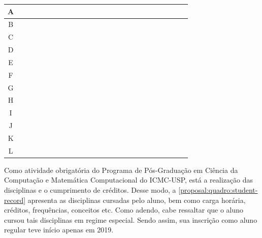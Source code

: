 \begin{quadro}[!ht]
\begin{tabular}{|c|c|c|c|c|c|c|c|c|c|c|c|c|c|c|c|c|c|c|c|c|c|c|c|c|}
  \hline
  
  \hspace{2mm}A\hspace{2mm}   
  & \y & \y & \y & \y & \y & \y & \y & \y & \y & \y & \y & \y  & \x & \x & \x & \x & \x  & \x & \x & \x & \x & \x & \x & \x\\
  \hline
  B
   & \y & \y & \y & \y & \y & \y & \y & \y & \y & \y & \x & \x  & \x & \x & \x & \x & \x  & \x & \x & \x & \x & \x & \x & \x\\
  \hline
  C
  & \x & \x & \x & \x & \x & \x & \x & \x & \x & \x & \x & \x  & \y & \y & \y & \x & \x  & \x & \x & \x & \x & \x & \x & \x\\
  \hline
  D
  & \x & \x & \x & \x & \x & \x & \x & \x & \x & \x & \x & \x  & \x & \y & \y & \x & \x  & \x & \x & \x & \x & \x & \x & \x\\
  \hline
  E
  & \x & \x & \x & \x & \x & \x & \x & \x & \x & \x & \x & \x  & \x & \x & \y & \y & \x  & \x & \x & \x & \x & \x & \x & \x\\
  \hline
  F
  & \x & \x & \x & \x & \x & \x & \x & \x & \x & \x & \x & \x  & \x & \x & \y & \y & \y  & \y & \y & \y & \y & \x & \x & \x\\
  \hline
  G
  & \x & \x & \x & \x & \x & \x & \x & \x & \x & \x & \x & \x  & \x & \x & \x & \x & \x  & \x & \x & \x & \y & \y & \y & \x\\
  \hline
  H
  & \y & \x & \x & \x & \x & \x & \x & \x & \x & \x & \x & \x  & \x & \x & \x & \x & \x  & \x & \x & \x & \x & \x & \x & \x\\
  \hline
  I
  & \y & \x & \x & \x & \x & \x & \x & \x & \x & \x & \x & \x  & \x & \x & \x & \x & \x  & \x & \x & \x & \x & \x & \x & \x\\
  \hline
  J
  & \x & \x & \x & \x & \x & \x & \y & \y & \y & \y & \y & \y  & \x & \x & \x & \x & \x  & \x & \x & \x & \x & \x & \x & \x\\
  \hline
  K
  & \x & \x & \y & \y & \y & \y & \y & \y & \y & \y & \y & \y  & \y & \y & \y & \y & \y  & \y & \y & \y & \x & \x & \x & \x\\
  \hline
  L
  & \x & \x & \x & \x & \x & \x & \x & \x & \x & \x & \x & \x  & \x & \x & \y & \y & \y  & \y & \y & \y & \y & \y & \y & \y\\
  \hline

\end{tabular}
\label{quadro:cronograma}
\normalsize
\fautor
\end{quadro}

Como atividade obrigatória do Programa de Pós-Graduação em Ciência da Computação e Matemática Computacional do ICMC-USP, está a realização das disciplinas e o cumprimento de créditos. Desse modo, a \autoref{proposal:quadro:student-record} apresenta as disciplinas cursadas pelo aluno, bem como carga horária, créditos, frequências, conceitos etc. Como adendo, cabe ressaltar que o aluno cursou tais disciplinas em regime especial. Sendo assim, sua inscrição como aluno regular teve início apenas em 2019.

